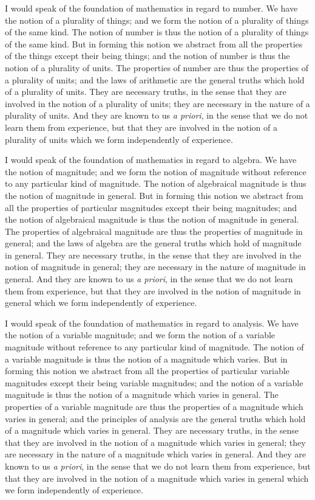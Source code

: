 \documentclass[11pt,a4paper]{article}
\begin{document}
I would speak of the foundation of mathematics in regard to number. We
have the notion of a plurality of things; and we form the notion of a
plurality of things of the same kind. The notion of number is thus the
notion of a plurality of things of the same kind. But in forming this
notion we abstract from all the properties of the things except their
being things; and the notion of number is thus the notion of a plurality
of units. The properties of number are thus the properties of a
plurality of units; and the laws of arithmetic are the general truths
which hold of a plurality of units. They are necessary truths, in the
sense that they are involved in the notion of a plurality of units;
they are necessary in the nature of a plurality of units. And they are
known to us \textit{a priori}, in the sense that we do not learn them from
experience, but that they are involved in the notion of a plurality of
units which we form independently of experience.

I would speak of the foundation of mathematics in regard to algebra. We
have the notion of magnitude; and we form the notion of magnitude
without reference to any particular kind of magnitude. The notion of
algebraical magnitude is thus the notion of magnitude in general. But
in forming this notion we abstract from all the properties of particular
magnitudes except their being magnitudes; and the notion of algebraical
magnitude is thus the notion of magnitude in general. The properties of
algebraical magnitude are thus the properties of magnitude in general;
and the laws of algebra are the general truths which hold of magnitude
in general. They are necessary truths, in the sense that they are
involved in the notion of magnitude in general; they are necessary in
the nature of magnitude in general. And they are known to us
\textit{a priori}, in the sense that we do not learn them from experience,
but that they are involved in the notion of magnitude in general which
we form independently of experience.

I would speak of the foundation of mathematics in regard to analysis.
We have the notion of a variable magnitude; and we form the notion of a
variable magnitude without reference to any particular kind of magnitude.
The notion of a variable magnitude is thus the notion of a magnitude
which varies. But in forming this notion we abstract from all the
properties of particular variable magnitudes except their being variable
magnitudes; and the notion of a variable magnitude is thus the notion of
a magnitude which varies in general. The properties of a variable
magnitude are thus the properties of a magnitude which varies in general;
and the principles of analysis are the general truths which hold of a
magnitude which varies in general. They are necessary truths, in the
sense that they are involved in the notion of a magnitude which varies
in general; they are necessary in the nature of a magnitude which varies
in general. And they are known to us \textit{a priori}, in the sense
that we do not learn them from experience, but that they are involved in
the notion of a magnitude which varies in general which we form
independently of experience.
\end{document}
